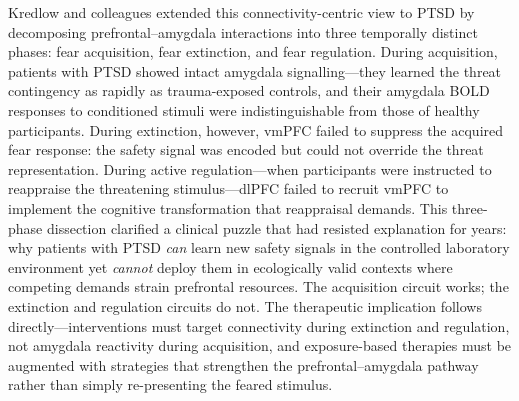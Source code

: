 Kredlow and colleagues extended this connectivity-centric view to PTSD by
decomposing prefrontal--amygdala interactions into three temporally distinct
phases: fear acquisition, fear extinction, and fear regulation.\cite{kredlow2021}
During acquisition, patients with PTSD showed intact amygdala
signalling---they learned the threat contingency as rapidly as
trauma-exposed controls, and their amygdala BOLD responses to conditioned
stimuli were indistinguishable from those of healthy participants.  During
extinction, however, vmPFC failed to suppress the acquired fear response:
the safety signal was encoded but could not override the threat
representation.  During active regulation---when participants were
instructed to reappraise the threatening stimulus---dlPFC failed to recruit
vmPFC to implement the cognitive transformation that reappraisal demands.
This three-phase dissection clarified a clinical puzzle that had resisted
explanation for years: why patients with PTSD \emph{can} learn new safety
signals in the controlled laboratory environment yet \emph{cannot} deploy
them in ecologically valid contexts where competing demands strain
prefrontal resources.  The acquisition circuit works; the extinction and
regulation circuits do not.  The therapeutic implication follows
directly---interventions must target connectivity during extinction and
regulation, not amygdala reactivity during acquisition, and
exposure-based therapies must be augmented with strategies that strengthen
the prefrontal--amygdala pathway rather than simply re-presenting the
feared stimulus.

